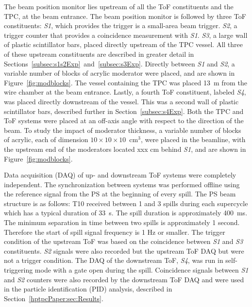 The beam position monitor lies upstream of all the ToF constituents and the TPC, at the beam entrance. 
The beam position monitor is followed by three ToF constituents: \textit{S1}, which provides the trigger is a small-area beam trigger.
\textit{S2}, a trigger counter that provides a coincidence measurement with \textit{S1}.
\textit{S3}, a large wall of plastic scintillator bars, placed directly upstream of the TPC vessel.
All three of these upstream constituents are described in greater detail in Sections~\ref{subsec:s1s2Exp}~and~\ref{subsec:s3Exp}.
Directly between \textit{S1} and \textit{S2}, a variable number of blocks of acrylic moderator were placed, and are shown in Figure~\ref{fig:modblocks}.
The vessel containing the TPC was placed 13~m from the wire chamber at the beam entrance.
Lastly, a fourth ToF constituent, labeled \textit{S4}, was placed directly downstream of the vessel.
This was a second wall of plastic scintillator bars, described further in Section~\ref{subsec:s4Exp}.
Both the TPC and ToF systems were placed at an off-axis angle with respect to the direction of the beam.
To study the impact of moderator thickness, a variable number of blocks of acrylic, each of dimension $10\times10\times10$~cm$^3$, were placed in the beamline, with the upstream end of the moderators located xxx cm behind \textit{S1}, and are shown in Figure~\ref{fig:modblocks}.


Data acquisition (DAQ) of up- and downstream ToF systems were completely independent.
The synchronization between systems was performed offline using the reference signal from the PS at the beginning of every spill.
The PS beam structure is as follows: T10 received between 1 and 3 spills during each supercycle which has a typical duration of 33~s.
The spill duration is approximately 400~ms.
The minimum separation in time between two spills is approximately 1 second.
Therefore the start of spill signal frequency is 1 Hz or smaller.
The trigger condition of the upstream ToF was based on the coincidence between \textit{S1} and \textit{S3} constituents.
\textit{S2} signals were also recorded but the upstream ToF DAQ but were not a trigger condition.
The DAQ of the downstream ToF, \textit{S4}, was run in self-triggering mode with a gate open during the spill.
Coincidence signals between \textit{S1} and \textit{S2} counters were also recorded by the downstream ToF DAQ and were used in the particle identification (PID) analysis, described in Section~\ref{hptpcPaper:sec:Results}.  

